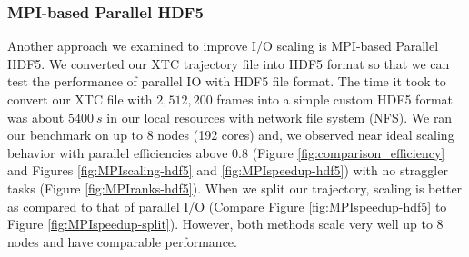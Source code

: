 \subsubsection{MPI-based Parallel HDF5}
\label{HDF5}
Another approach we examined to improve I/O scaling is MPI-based Parallel HDF5. 
We converted our XTC trajectory file into HDF5 format so that we can test the performance of parallel IO with HDF5 file format.
The time it took to convert our XTC file with $2,512,200$ frames into a simple custom HDF5 format was about $5400~s$ in our local resources with network file system (NFS).
We ran our benchmark on up to 8 nodes (192 cores) and, we observed near ideal scaling behavior with parallel efficiencies above 0.8 (Figure \ref{fig:comparison_efficiency} and Figures \ref{fig:MPIscaling-hdf5} and \ref{fig:MPIspeedup-hdf5}) with no straggler tasks (Figure \ref{fig:MPIranks-hdf5}).  
When we split our trajectory, scaling is better as compared to that of parallel I/O (Compare Figure \ref{fig:MPIspeedup-hdf5} to Figure \ref{fig:MPIspeedup-split}). 
However, both methods scale very well up to 8 nodes and have comparable performance.  

